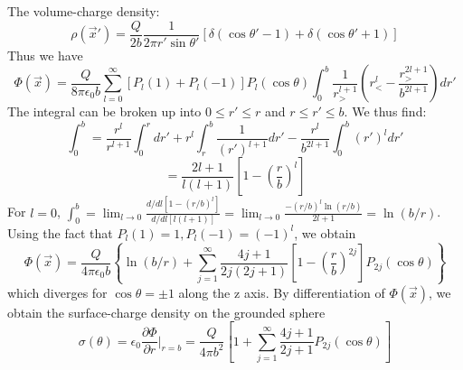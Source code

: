 \documentclass{article}
\begin{document}
	The volume-charge density:
	\begin{equation*}
		\rho(\vec{x}') = \frac{Q}{2b} \frac{1}{2\pi r' \sin\theta'} [\delta(\cos\theta'-1) + \delta(\cos\theta'+1)]
	\end{equation*}
	Thus we have
	\begin{equation*}
		\Phi(\vec{x}) = \frac{Q}{8\pi\epsilon_0 b} \sum_{l=0}^\infty [P_l(1)+P_l(-1)] P_l(\cos\theta) \int_0^b \frac{1}{r_>^{l+1}} \left( r_<^l - \frac{r_>^{2l+1}}{b^{2l+1}} \right) dr'
	\end{equation*}
	The integral can be broken up into $0 \le r' \le r$ and $r \le r' \le b$.
	We thus find:
	\begin{equation*}
		\int_0^b = \frac{r^l}{r^{l+1}} \int_0^r dr' + r^l \int_r^b \frac{1}{(r')^{l+1}} dr' - \frac{r^l}{b^{2l+1}} \int_0^b (r')^l dr'
	\end{equation*}
	\begin{equation*}
		= \frac{2l+1}{l(l+1)} \left[ 1 - \left(\frac{r}{b}\right)^l \right]
	\end{equation*}
	For $l=0$, $\int_0^b = \lim_{l\to 0} \frac{d/dl [1-(r/b)^l]}{d/dl [l(l+1)]} = \lim_{l\to 0} \frac{-(r/b)^l \ln(r/b)}{2l+1} = \ln(b/r)$.
	Using the fact that $P_l(1)=1, P_l(-1)=(-1)^l$, we obtain
	\begin{equation*}
		\Phi(\vec{x}) = \frac{Q}{4\pi\epsilon_0 b} \left\{ \ln(b/r) + \sum_{j=1}^{\infty} \frac{4j+1}{2j(2j+1)} \left[ 1-\left(\frac{r}{b}\right)^{2j} \right] P_{2j}(\cos\theta) \right\}
	\end{equation*}
	which diverges for $\cos\theta = \pm 1$ along the z axis.
	By differentiation of $\Phi(\vec{x})$, we obtain the surface-charge density on the grounded sphere
	\begin{equation*}
		\sigma(\theta) = \epsilon_0 \frac{\partial \Phi}{\partial r} \Big|_{r=b} = \frac{Q}{4\pi b^2} \left[ 1 + \sum_{j=1}^{\infty} \frac{4j+1}{2j+1} P_{2j}(\cos\theta) \right]
	\end{equation*}
	
\end{document}
